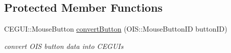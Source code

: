 \subsection*{Protected Member Functions}
\begin{DoxyCompactItemize}
\item 
C\+E\+G\+U\+I\+::\+Mouse\+Button \hyperlink{class_n_c_t_u_1_1_g_u_i_manager_a18903a21874b5ffd27fa39980f85cf31}{convert\+Button} (O\+I\+S\+::\+Mouse\+Button\+ID button\+ID)\hypertarget{class_n_c_t_u_1_1_g_u_i_manager_a18903a21874b5ffd27fa39980f85cf31}{}\label{class_n_c_t_u_1_1_g_u_i_manager_a18903a21874b5ffd27fa39980f85cf31}

\begin{DoxyCompactList}\small\item\em convert O\+IS button data into C\+E\+G\+UI\textquotesingle{}s \end{DoxyCompactList}\end{DoxyCompactItemize}
